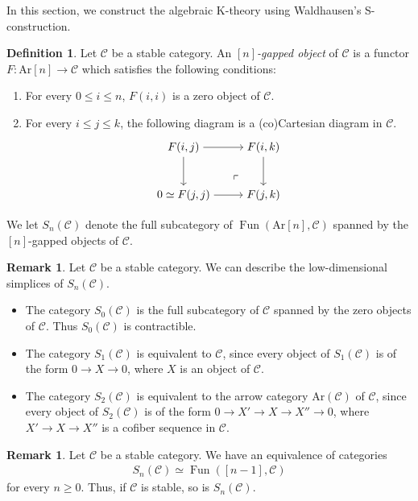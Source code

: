 \documentclass[a4paper,dvipdfmx,11pt,reqno]{amsart}
\DeclareMathOperator{\Fun}{Fun}
\newcommand{\C}{\mathcal{C}}
\newcommand{\Ar}{\mathrm{Ar}}
\theoremstyle{definition}
\newtheorem{definition}[theorem]{Definition}
\newtheorem{remark}[theorem]{Remark}
\begin{document}
In this section, we construct the algebraic K-theory using Waldhausen's S-construction. 

\begin{definition}
  Let $\C$ be a stable category.
  An \textit{$[n]$-gapped object} of $\C$ is a functor $F : \Ar[n] \to \C$ which satisfies the following conditions:
  \begin{enumerate}
    \item For every $0 \leq i \leq n$, $F(i,i)$ is a zero object of $\C$.
    \item For every $i \leq j \leq k$, the following diagram is a (co)Cartesian diagram in $\C$.
    \[\begin{tikzpicture}[auto,->] 
      \node (tl) at (0,1.5) {$F(i,j)$}; 
      \node (tr) at (2.5,1.5) {$F(i,k)$};
      \node (bl) at (0,0) {$0 \simeq F(j,j)$}; 
      \node (br) at (2.5,0) {$F(j,k)$}; 
      \draw (tl) -- node {} (tr); 
      \draw (bl) -- node[swap] {} (br); 
      \draw (tl) -- node[swap] {} (bl);
      \draw (tr) -- node {} (br); 
      \node at ([xshift=-1.5cm, yshift=0.8cm] br.south east) {$\ulcorner$};
    \end{tikzpicture}\]
  \end{enumerate}
  We let $S_n(\C)$ denote the full subcategory of $\Fun(\Ar[n],\C)$ spanned by the $[n]$-gapped objects of $\C$.
\end{definition}

\begin{remark} \label{Ber.eg.4.1}
  Let $\C$ be a stable category.
  We can describe the low-dimensional simplices of $S_n(\C)$.
  \begin{itemize}
    \item The category $S_0(\C)$ is the full subcategory of $\C$ spanned by the zero objects of $\C$. 
    Thus $S_0(\C)$ is contractible.
    \item The category $S_1(\C)$ is equivalent to $\C$, since every object of $S_1(\C)$ is of the form $0 \to X \to 0$, where $X$ is an object of $\C$.
    \item The category $S_2(\C)$ is equivalent to the arrow category $\Ar(\C)$ of $\C$, since every object of $S_2(\C)$ is of the form $0 \to X' \to X \to X'' \to 0$, where $X' \to X \to X''$ is a cofiber sequence in $\C$. 
  \end{itemize}
\end{remark}

\begin{remark} \label{Ber.rem.4.2}
  Let $\C$ be a stable category.
  We have an equivalence of categories 
  \begin{align*}
    S_n(\C) \simeq \Fun([n-1],\C)
  \end{align*}
  for every $n \geq 0$.
  Thus, if $\C$ is stable, so is $S_n(\C)$.
\end{remark}
\end{document}
